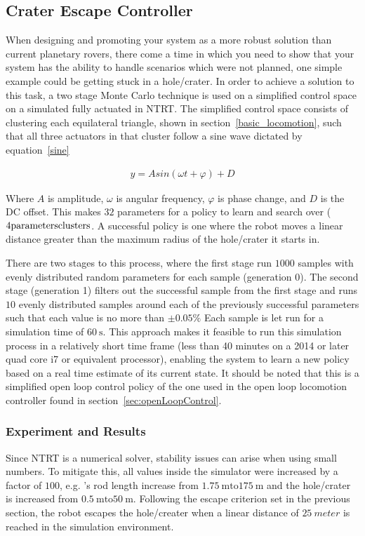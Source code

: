 \subsection{Crater Escape Controller}
\label{sec:crater}
When designing and promoting your system as a more robust solution than current planetary rovers, there come a time in which you need to show that your system has the ability to handle scenarios which were not planned, one simple example could be getting stuck in a hole/crater.
In order to achieve a solution to this task, a two stage Monte Carlo technique is used on a simplified control space on a simulated fully actuated \SB{} in NTRT.
The simplified control space consists of clustering each equilateral triangle, shown in section~\ref{basic_locomotion}, such that all three actuators in that cluster follow a sine wave dictated by equation~\ref{sine}

\begin{align}
y = Asin(\omega t + \varphi) + D
\label{sine}
\end{align}

Where \(A\) is amplitude, \(\omega\) is angular frequency, \(\varphi\) is phase change, and \(D\) is the DC offset.
This makes \(32\) parameters for a policy to learn and search over (\(4 \text{parameters} \time 8 \text{clusters}\).
A successful policy is one where the robot moves a linear distance greater than the maximum radius of the hole/crater it starts in.

There are two stages to this process, where the first stage run \(1000\) samples with evenly distributed random parameters for each sample (generation 0).
The second stage (generation 1) filters out the successful sample from the first stage and runs \(10\) evenly distributed samples around each of the previously successful parameters such that each value is no more than \(\pm 0.05\%\)
Each sample is let run for a simulation time of \(\SI{60}{\second}\).
This approach makes it feasible to run this simulation process in a relatively short time frame (less than 40 minutes on a 2014 or later quad core i7 or equivalent processor), enabling the system to learn a new policy based on a real time estimate of its current state.
It should be noted that this is a simplified open loop control policy of the one used in the open loop locomotion controller found in section~\ref{sec:openLoopControl}.

\subsubsection{Experiment and Results}
Since NTRT is a numerical solver, stability issues can arise when using small numbers.
To mitigate this, all values inside the simulator were increased by a factor of \(100\), e.g. \SB{}'s rod length increase from \(\SI{1.75}{\meter} \text{to} \SI{175}{\meter}\) and the hole/crater is increased from \(\SI{0.5}{\meter} \text{to} \SI{50}{\meter}\).
Following the escape criterion set in the previous section, the robot escapes the hole/creater when a linear distance of \(\SI{25}{meter}\) is reached in the simulation environment.

